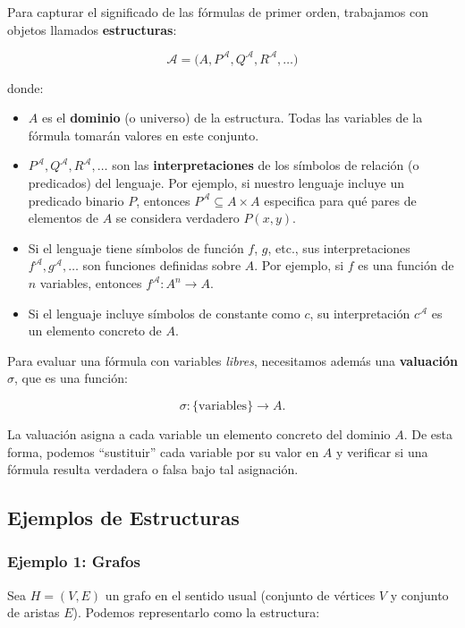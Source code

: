 Para capturar el significado de las fórmulas de primer orden, trabajamos con objetos llamados \textbf{estructuras}:

\[
    \mathcal{A} = \bigl(A, P^{\mathcal{A}}, Q^{\mathcal{A}}, R^{\mathcal{A}}, \dots\bigr)
\]

donde:
\begin{itemize}
    \item $A$ es el \textbf{dominio} (o universo) de la estructura. Todas las variables de la fórmula tomarán valores en este conjunto.
    \item $P^{\mathcal{A}}, Q^{\mathcal{A}}, R^{\mathcal{A}}, \dots$ son las \textbf{interpretaciones} de los símbolos de relación (o predicados) del lenguaje. Por ejemplo, si nuestro lenguaje incluye un predicado binario $P$, entonces $P^{\mathcal{A}} \subseteq A \times A$ especifica para qué pares de elementos de $A$ se considera verdadero $P(x,y)$.
    \item Si el lenguaje tiene símbolos de función $f$, $g$, etc., sus interpretaciones $f^{\mathcal{A}}, g^{\mathcal{A}}, \dots$ son funciones definidas sobre $A$. Por ejemplo, si $f$ es una función de $n$ variables, entonces $f^{\mathcal{A}} : A^n \to A$.
    \item Si el lenguaje incluye símbolos de constante como $c$, su interpretación $c^{\mathcal{A}}$ es un elemento concreto de $A$.
\end{itemize}

Para evaluar una fórmula con variables \emph{libres}, necesitamos además una \textbf{valuación} $\sigma$, que es una función:

\[
    \sigma : \{\text{variables}\} \longrightarrow A.
\]

La valuación asigna a cada variable un elemento concreto del dominio $A$. De esta forma, podemos “sustituir” cada variable por su valor en $A$ y verificar si una fórmula resulta verdadera o falsa bajo tal asignación.

\subsection{Ejemplos de Estructuras}

\subsubsection{Ejemplo 1: Grafos}
Sea $H = (V, E)$ un grafo en el sentido usual (conjunto de vértices $V$ y conjunto de aristas $E$). Podemos representarlo como la estructura:

